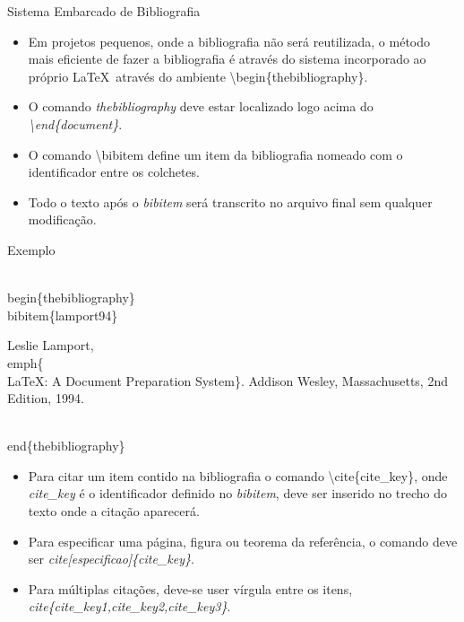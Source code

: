 \begin{frame}{Sistema Embarcado de Bibliografia}

  \begin{itemize}
    \item Em projetos pequenos, onde a bibliografia não será reutilizada, o método mais eficiente de fazer a bibliografia
    é através do sistema incorporado ao próprio \LaTeX\ através do ambiente \alert{\textbackslash begin\{thebibliography\}}.    
    \item O comando \textit{thebibliography} deve estar localizado logo acima do \textit{\textbackslash end\{document\}}.
    \item O comando \alert{\textbackslash bibitem} define um item da bibliografia nomeado com o identificador entre os colchetes.
    \item Todo o texto após o \textit{bibitem} será transcrito no arquivo final sem qualquer modificação.
  \end{itemize}

  \begin{exampleblock}{Exemplo}
  \begin{semiverbatim}
    \\begin\{thebibliography\}
    \\bibitem\{lamport94\}

      Leslie Lamport,
      \\emph\{\\LaTeX: A Document Preparation System\}.
      Addison Wesley, Massachusetts,
      2nd Edition,
      1994.

    \\end\{thebibliography\}
  \end{semiverbatim}
  \end{exampleblock}

    \newpage

  \begin{itemize}
   \item Para citar um item contido na bibliografia o comando \alert{\textbackslash cite\{cite\_key\}}, onde \textit{cite\_key} é o 
   identificador definido no \textit{bibitem}, deve ser inserido no trecho do texto onde a citação aparecerá.
   \item Para especificar uma página, figura ou teorema da referência, o comando deve ser \textit{cite[especificao]\{cite\_key\}}.
   \item Para múltiplas citações, deve-se user vírgula entre os itens, \textit{cite\{cite\_key1,cite\_key2,cite\_key3\}}.    
  \end{itemize}
 
\end{frame}

